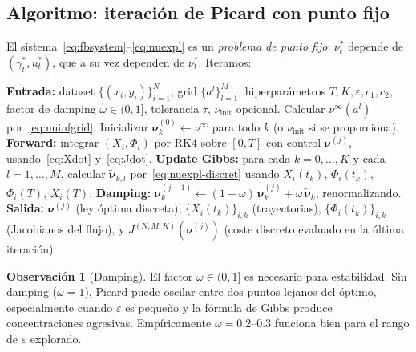 \documentclass[11pt, a4paper]{article}
\theoremstyle{definition}
\newtheorem{remark}{Observación}[section]
\newcommand{\norm}[1]{\left\|#1\right\|}
\newcommand{\eps}{\varepsilon}
\begin{document}
\subsection{Algoritmo: iteración de Picard con punto fijo}
\label{ssec:picard}

El sistema~\eqref{eq:fbsystem}--\eqref{eq:nuexpl} es un \emph{problema
de punto fijo}: $\nu_t^*$ depende de $(\gamma_t^*, u_t^*)$, que a su vez
dependen de $\nu_t^*$. Iteramos:

\begin{algorithm}[H]
\caption{Picard fixed-point para la solución explícita}
\label{alg:picard}
\begin{algorithmic}[1]
\State \textbf{Entrada:} dataset $\{(x_i, y_i)\}_{i=1}^{N}$, grid
       $\{a^l\}_{l=1}^{M}$, hiperparámetros
       $T, K, \eps, c_1, c_2$, factor de damping $\omega \in (0, 1]$,
       tolerancia $\tau$, $\nu_{\mathrm{init}}$ opcional.
\State Calcular $\nu^{\infty}(a^l)$ por~\eqref{eq:nuinfgrid}.
\State Inicializar $\boldsymbol{\nu}^{(0)}_{k} \leftarrow \nu^{\infty}$ para todo $k$
       (o $\nu_{\mathrm{init}}$ si se proporciona).
\For{$j = 0, 1, 2, \dots$ hasta $\max_k \norm{\boldsymbol{\nu}^{(j+1)}_k - \boldsymbol{\nu}^{(j)}_k}_{\mathrm{TV}}/2 < \tau$}
  \State \textbf{Forward:} integrar $(X_i, \Phi_i)$ por RK4 sobre $[0, T]$ con
         control $\boldsymbol{\nu}^{(j)}$, usando~\eqref{eq:Xdot}
         y~\eqref{eq:Jdot}.
  \State \textbf{Update Gibbs:} para cada $k = 0, \dots, K$ y cada
         $l = 1, \dots, M$, calcular
         $\tilde{\boldsymbol{\nu}}_{k, l}$
         por~\eqref{eq:nuexpl-discret} usando
         $X_i(t_k)$, $\Phi_i(t_k)$, $\Phi_i(T)$, $X_i(T)$.
  \State \textbf{Damping:}
         $\boldsymbol{\nu}^{(j+1)}_{k} \leftarrow
          (1 - \omega)\, \boldsymbol{\nu}^{(j)}_{k}
          + \omega\, \tilde{\boldsymbol{\nu}}_{k}$,
         renormalizando.
\EndFor
\State \textbf{Salida:} $\boldsymbol{\nu}^{(j)}$ (ley óptima discreta),
       $\{X_i(t_k)\}_{i, k}$ (trayectorias),
       $\{\Phi_i(t_k)\}_{i, k}$ (Jacobianos del flujo),
       y $J^{(N, M, K)}(\boldsymbol{\nu}^{(j)})$ (coste discreto evaluado en
       la última iteración).
\end{algorithmic}
\end{algorithm}

\begin{remark}[Damping]
El factor $\omega \in (0, 1]$ es necesario para estabilidad. Sin
damping ($\omega = 1$), Picard puede oscilar entre dos puntos lejanos
del óptimo, especialmente cuando $\eps$ es pequeño y la fórmula de
Gibbs produce concentraciones agresivas. Empíricamente $\omega = 0.2\text{--}0.3$
funciona bien para el rango de $\eps$ explorado.
\end{remark}
\end{document}
